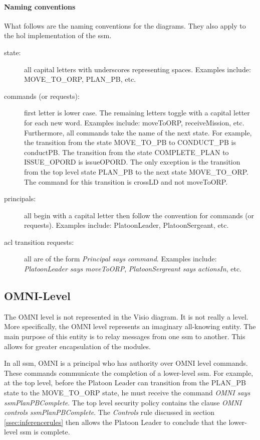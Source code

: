 \documentclass[../../main/main.tex]{subfiles}
\begin{document}
\paragraph*{Naming conventions}
What follows are the naming conventions for the diagrams.  They also apply to the \gls{hol} implementation of the \gls{ssm}.
\begin{description}
\item[state: ] all capital letters with underscores representing spaces.  Examples include: MOVE_TO_ORP, PLAN_PB, etc.
\item[commands (or requests):] first letter is lower case.  The remaining letters toggle with a capital letter for each new word.  Examples include: moveToORP,  receiveMission, etc.  Furthermore, all commands take the name of the next state. For example, the transition from the state MOVE_TO_PB to CONDUCT_PB is conductPB.  The transition from the state COMPLETE_PLAN to ISSUE_OPORD is issueOPORD.  The only exception is the transition from the top level state PLAN_PB to the next state MOVE_TO_ORP.  The command for this transition is crossLD and not moveToORP.
\item[principals:] all begin with a capital letter then follow the convention for commands (or requests).  Examples include: PlatoonLeader, PlatoonSergeant, etc.
\item [\gls{acl} transition requests:] all are of the form \textit{Principal says command}.  Examples include: \textit{PlatoonLeader says moveToORP}, \textit{PlatoonSergreant says actionsIn}, etc.
\end{description}

\subsection{OMNI-Level}\label{ssec:omnilevel}
The OMNI level is not represented in the Visio diagram.  It is not really a level.  More specifically, the OMNI level represents an imaginary all-knowing entity.  The main purpose of this entity is to relay messages from one \gls{ssm} to another.  This allows for greater encapsulation of the modules. 

In all \gls{ssm}, OMNI is a principal who has authority over OMNI level commands.  These commands communicate the completion of a lower-level \gls{ssm}.  For example, at the top level, before the Platoon Leader can transition from the PLAN_PB state to the MOVE_TO_ORP state, he must receive the command \textit{OMNI says ssmPlanPBComplete}.  The top level security policy contains the clause \textit{OMNI controls ssmPlanPBComplete}.  The \textit{Controls} rule discussed in section \ref{ssec:inferencerules} then allows the Platoon Leader to conclude that the lower-level \gls{ssm} is complete.  
\clearpage
\end{document}

